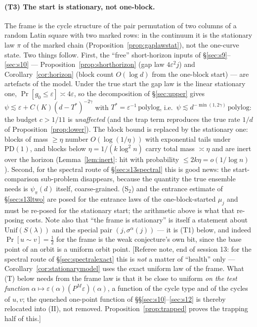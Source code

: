 \paragraph{(T3) The start is stationary, not one-block.}
The frame is the cycle structure of the pair permutation of two
columns of a random Latin square with two marked rows: in the
continuum it is the stationary law $\pi$ of the marked chain
(Proposition~\ref{prop:gaplawstat}), not the one-curve state.  Two
things follow.  First, the ``free'' short-horizon inputs of
\S\ref{sec:s9}--\ref{sec:s10} --- Proposition~\ref{prop:shorthorizon}
(gap law $4\varepsilon^2j$) and Corollary~\ref{cor:horizon} (block
count $O(\log d)$ from the one-block start) --- are artefacts of the
model.  Under the true start the gap law is the linear stationary
one, $\Pr[g_0\le\varepsilon]\asymp4\varepsilon$, so the decomposition
of \S\ref{sec:upper} gives $\psi\lesssim\varepsilon+C(K)(d-T^*)^{-2\gamma}$
with $T^*=\varepsilon^{-1}\,\mathrm{polylog}$, i.e.\
$\psi\lesssim d^{-\min(1,2\gamma)}\,\mathrm{polylog}$: the budget
$c>1/11$ is \emph{unaffected} (and the trap term reproduces the true
rate $1/d$ of Proposition~\ref{prop:lower}).  The block bound is
replaced by the stationary one: blocks of mass $\ge\eta$ number
$O(\log(1/\eta))$ with exponential tails under $\mathrm{PD}(1)$, and
blocks below $\eta=1/(k\log^2n)$ carry total mass $\asymp\eta$ and are
inert over the horizon (Lemma~\ref{lem:inert}: hit with probability
$\le2k\eta=o(1/\log n)$).  Second, for the spectral route of
\S\ref{sec:s13spectral} this is good news: the start-comparison
sub-problem disappears, because the quantity the true ensemble needs
is $\psi_\pi(d)$ itself, coarse-grained.  (S$_2$) and the entrance
estimate of \S\ref{sec:s13ltwo} are posed for the entrance laws of
the one-block-started $\mu_j$ and must be re-posed for the
stationary start; the arithmetic above is what that re-posing
costs.  Note also that ``the frame is stationary'' is itself a
statement about $\mathrm{Unif}(S(\lambda))$ and the special pair
$(j,\sigma^\alpha(j))$ --- it is (T1) below, and indeed
$\Pr[u\sim v]=\tfrac12$ for the frame is the weak conjecture's own
bit, since the base point of an orbit is a uniform orbit point.
[Referee note, end of session 13: for the spectral route of
\S\ref{sec:spectralexact} this is \emph{not} a matter of ``health''
only --- Corollary~\ref{cor:stationarymodel} uses the exact uniform
law of the frame.  What (T) below needs from the frame law is that
it be close to uniform \emph{on the test function}
$\alpha\mapsto\varepsilon(\alpha)(P^M\varepsilon)(\alpha)$, a function
of the cycle type and of the cycles of $u,v$; the quenched one-point
function of \S\S\ref{sec:s10}--\ref{sec:s12} is thereby relocated
into (II), not removed.  Proposition~\ref{prop:trapped} proves the
trapping half of this.]

